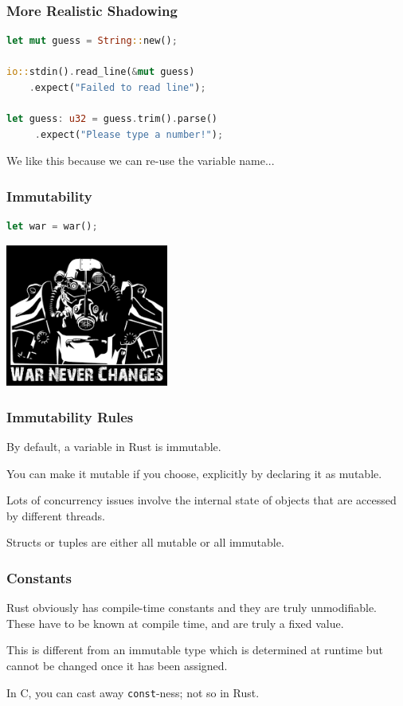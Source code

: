 \begin{frame}[fragile]
\frametitle{More Realistic Shadowing}

\begin{lstlisting}[language=Rust]
let mut guess = String::new();

io::stdin().read_line(&mut guess)
    .expect("Failed to read line");

let guess: u32 = guess.trim().parse()
     .expect("Please type a number!");
\end{lstlisting}

We like this because we can re-use the variable name...

\end{frame}


\begin{frame}[fragile]
\frametitle{Immutability}

\begin{lstlisting}[language=Rust]
let war = war();
\end{lstlisting}

\begin{center}
	\includegraphics[width=0.4\textwidth]{images/fallout.png}
\end{center}

\end{frame}


\begin{frame}
\frametitle{Immutability Rules}

By default, a variable in Rust is immutable. 

You can make it mutable if you choose, explicitly by declaring it as mutable.

Lots of concurrency issues involve the internal state of objects that are accessed by different threads. 

Structs or tuples are either all mutable or all immutable.


\end{frame}

\begin{frame}
\frametitle{Constants}

Rust obviously has compile-time constants and they are truly unmodifiable. These have to be known at compile time, and are truly a fixed value. 

This is different from an immutable type which is determined at runtime but cannot be changed once it has been assigned.

In C, you can cast away {\tt const}-ness; not so in Rust.


\end{frame}



